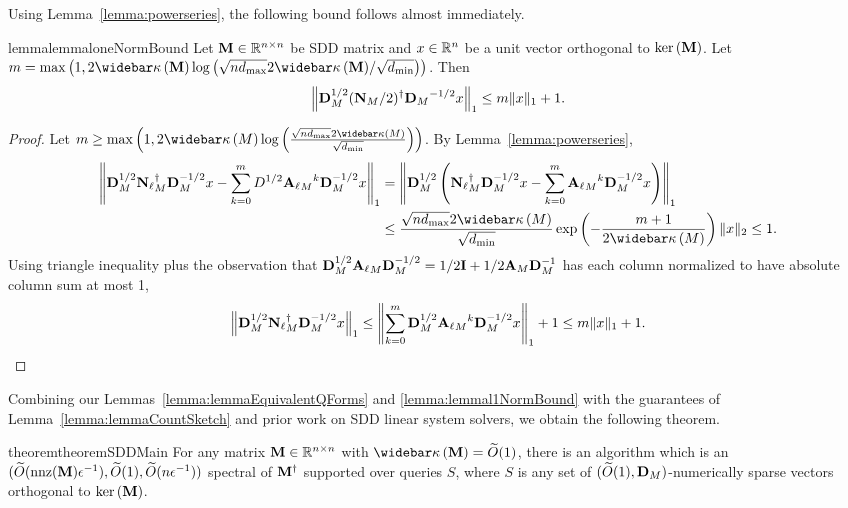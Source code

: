 Using Lemma~\ref{lemma:powerseries}, the following bound follows almost immediately.

\begin{restatable}{lemma}{lemmaloneNormBound}\label{lemma:lemmal1NormBound} Let $\mathbf{M} \in \mathbb{R}^{n \times n}$ be SDD matrix and $x \in \mathbb{R}^n$ be a unit vector orthogonal to $\mathrm{ker}\left(\mathbf{M}\right)$. Let $m = \max\left(1, 2\pcondOf{\M}\log\left({\sqrt{n\dmax} 2\pcondOf{\M}}/{\sqrt{\dmin}}\right)\right)$. Then 
\begin{align*}
    \left\|{\mathbf{D}}_{M}^{1/2} (\mathbf{N}_{M}/2)^{\dagger}  {{\mathbf{D}}_{M}}^{-1/2} x\right\|_1 \leq m \|x\|_1 + 1.
\end{align*}
\end{restatable}

\begin{proof} Let $m \geq \max\left(1, 2\pcondOf{M}\log\left(\frac{\sqrt{n\dmax} 2\pcondOf{M}}{\sqrt{\dmin}}\right)\right)$. By Lemma~\ref{lemma:powerseries}, 
\begin{align*}
    \left\Vert \diagonal{M}^{1/2} \normalizedlazy{M}^\dagger \diagonal{M}^{-1/2}x - \sum_{k=0}^{m} D^{1/2 }{\adjacencylazy{M}}^k \diagonal{M}^{-1/2} x \right\Vert_1 
    &= \left\Vert \diagonal{M}^{1/2}\left(\normalizedlazy{M}^\dagger \diagonal{M}^{-1/2}x - \sum_{k=0}^{m}  {\adjacencylazy{M}} ^k  \diagonal{M}^{-1/2}x \right) \right\Vert_1 \\
    &\leq \frac{\sqrt{n\dmax} 2\pcondOf{M}}{\sqrt{\dmin}} \exp\left(- \frac{m+1}{2\pcondOf{M}}\right) \norm{x}_2 
    \leq 1. 
\end{align*}
Using triangle inequality plus the observation that ${\mathbf{D}}_{M}^{1/2}{{\mathbf{A}_\ell}_{M}} {\mathbf{D}}_{M}^{-1/2} =  1/2 \mathbf{I} + 1/2{{\mathbf{A}}_{M}} {\mathbf{D}}_{M}^{-1}$ has each column normalized to have absolute column sum at most 1,
\begin{align*}
    \left\Vert {\mathbf{D}}_{M}^{1/2} {\mathbf{N}_\ell}_{M}^\dagger {\mathbf{D}}_{M}^{-1/2}x \right\Vert_1 \leq \left\Vert \sum_{k=0}^{m} {\mathbf{D}}_{M}^{1/2}{{\mathbf{A}_\ell}_{M}}^k {\mathbf{D}}_{M}^{-1/2} x \right\Vert_1 + 1 \leq m \Vert x \Vert_1 + 1.
\end{align*}
\end{proof}

Combining our Lemmas~\ref{lemma:lemmaEquivalentQForms} and \ref{lemma:lemmal1NormBound} with the guarantees of Lemma~\ref{lemma:lemmaCountSketch} and prior work on SDD linear system solvers, we obtain the following theorem.

\begin{restatable}{theorem}{theoremSDDMain}\label{theorem:theoremSDDMain} For any matrix $\mathbf{M} \in \mathbb{R}^{n \times n}$ with $\pcondOf{\M} = \Otilde{1}$, there is an algorithm which is an $(\widetilde{O}( {\mathrm{nnz}(\mathbf{M})\epsilon^{-1}} ), \widetilde{O}( {1} ), \widetilde{O}( {n\epsilon^{-1}} ))$ spectral of $\mathbf{M}^\dagger$ supported over queries $S$, where $S$ is any set of $(\widetilde{O}( {1} ), {\mathbf{D}}_{M})$-numerically sparse vectors orthogonal to $\mathrm{ker}\left(\mathbf{M}\right)$. 
\end{restatable}

